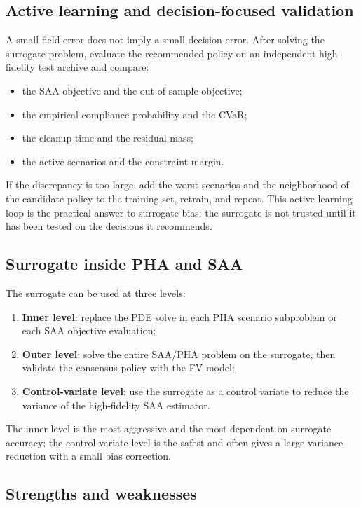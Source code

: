 \documentclass[11pt]{article}
\numberwithin{equation}{section}
\theoremstyle{plain}
\begin{document}
\subsection{Active learning and decision-focused validation}

A small field error does not imply a small decision error.  After solving the
surrogate problem, evaluate the recommended policy on an independent
high-fidelity test archive and compare:
\begin{itemize}[leftmargin=1.6em,itemsep=2pt]
  \item the SAA objective and the out-of-sample objective;
  \item the empirical compliance probability and the CVaR;
  \item the cleanup time and the residual mass;
  \item the active scenarios and the constraint margin.
\end{itemize}
If the discrepancy is too large, add the worst scenarios and the neighborhood
of the candidate policy to the training set, retrain, and repeat.  This
active-learning loop is the practical answer to surrogate bias: the surrogate
is not trusted until it has been tested on the decisions it recommends.

\subsection{Surrogate inside PHA and SAA}

The surrogate can be used at three levels:
\begin{enumerate}[leftmargin=1.6em,itemsep=2pt]
  \item \textbf{Inner level}: replace the PDE solve in each PHA scenario
        subproblem or each SAA objective evaluation;
  \item \textbf{Outer level}: solve the entire SAA/PHA problem on the
        surrogate, then validate the consensus policy with the FV model;
  \item \textbf{Control-variate level}: use the surrogate as a control variate
        to reduce the variance of the high-fidelity SAA estimator.
\end{enumerate}
The inner level is the most aggressive and the most dependent on surrogate
accuracy; the control-variate level is the safest and often gives a large
variance reduction with a small bias correction.

\subsection{Strengths and weaknesses}
\end{document}
